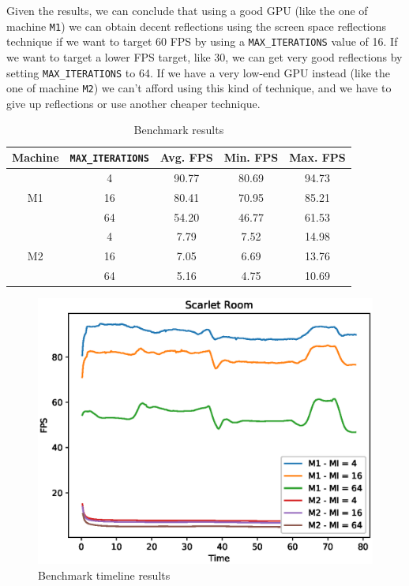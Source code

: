 \documentclass[11pt,a4paper]{report}
\begin{document}
Given the results, we can conclude that using a good GPU (like the one of machine \texttt{M1}) we can obtain decent reflections using the screen space reflections technique if we want to target 60 FPS by using a \texttt{MAX\_ITERATIONS} value of 16. If we want to target a lower FPS target, like 30, we can get very good reflections by setting \texttt{MAX\_ITERATIONS} to 64. If we have a very low-end GPU instead (like the one of machine \texttt{M2}) we can't afford using this kind of technique, and we have to give up reflections or use another cheaper technique.

\begin{table}
	\centering
	\begin{tabular}{|c|c|c|c|c|}
		\hline
		\textbf{Machine}    & \textbf{\texttt{MAX\_ITERATIONS}} & \textbf{Avg. FPS} & \textbf{Min. FPS} & \textbf{Max. FPS} \\ \hline
		\multirow{3}{*}{M1} & 4                                 & 90.77             & 80.69             & 94.73             \\
		& 16                                & 80.41             & 70.95             & 85.21             \\
		& 64                                & 54.20             & 46.77             & 61.53             \\ \hline
		\multirow{3}{*}{M2} & 4                                 & \phantom{0}7.79   & \phantom{0}7.52   & 14.98             \\
		& 16                                & \phantom{0}7.05   & \phantom{0}6.69   & 13.76             \\
		& 64                                & \phantom{0}5.16   & \phantom{0}4.75   & 10.69             \\ \hline
	\end{tabular}
	\caption{Benchmark results}
	\label{eval:table}
\end{table}

\begin{figure}[htp]
	\centering
	\includegraphics[width=\textwidth]{benchmark/benchmark.eps}
	\caption{Benchmark timeline results}
	\label{eval:graph}
\end{figure}
\end{document}
